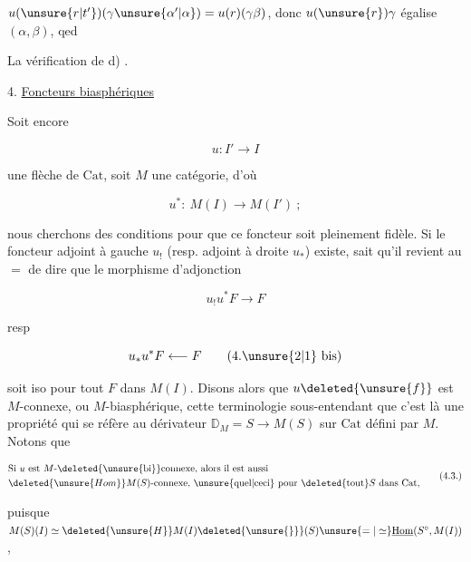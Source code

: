 
$u(\unsure{r|t'})(\gamma\unsure{\alpha'|\alpha})=u(r)(\gamma\beta)$, donc $u(\unsure{r})\gamma$ égalise $(\alpha,\beta)$, qed

La vérification de d)  .

4. \uline{Foncteurs biasphériques}

Soit encore

\[
u:I'\longrightarrow I
\]

une flèche de $\mathrm{Cat}$, soit $M$ une catégorie, d'où  

\[
u^*:\ M(I)\longrightarrow M(I')\ ;\tag*{(4.1.)}
\]

 nous cherchons des conditions  pour que ce foncteur soit pleinement fidèle. Si le foncteur adjoint à gauche $u_!$ (resp. adjoint à droite $u_*$) existe,  sait qu'il revient au $=$ de dire que le morphisme d'adjonction

\[
u_!u^*F\longrightarrow F\tag*{(4.2)}
\]

resp

\[
u_*u^*F\longleftarrow F\tag*{(4.\unsure{2|1} bis)}
\]

soit iso pour tout $F$ dans $M(I)$. Disons alors que $u\deleted{\unsure{f}}$ est $M$-connexe, ou $M$-biasphérique, cette terminologie sous-entendant que c'est là une propriété qui se réfère au dérivateur $\mathbb{D}_M=S\longrightarrow M(S)$ sur $\mathrm{Cat}$ défini par $M$. Notons que

\[
\begin{aligned}
&\text{Si }u\text{ est }M\text{-}\deleted{\unsure{\mathrm{bi}}}\text{connexe, alors il est aussi}\\
&\deleted{\unsure{Hom}} M(S)\text{-connexe, \unsure{quel|ceci} pour }\deleted{\text{tout}} S\text{ dans }\mathrm{Cat},
\end{aligned}\tag*{(4.3.)}
\]

puisque $M(S)(I)\simeq\deleted{\unsure{H}}M(I)\deleted{\unsure{\}}}(S)\unsure{=|\simeq}\underline{\mathrm{Hom}}(S^\circ,M(I))$,
